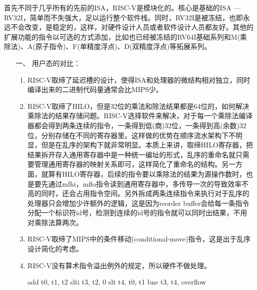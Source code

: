 首先不同于几乎所有的先前的ISA，RISC-V是模块化的。核心是基础的ISA --- RV32I，简单而不失强大，足以运行整个软件栈。同时，RV32I是被冻结，也即永远不会改变，是稳定的，这样，对硬件设计人员或者软件设计人员都友好。其他的扩展功能的指令以可选的方式添加，比如也已经被冻结的RV64I基础系列和M(乘除法)、A(原子指令)、F(单精度浮点)、D(双精度浮点)等拓展系列\citep{Patterson:2017:RRO:3202479}。
\begin{enumerate}%
	\item[一、] 用户态的对比：
	\begin{enumerate}[label=(\alph*)]
		\item RISC-V取缔了延迟槽的设计，使得ISA和处理器的微结构相对独立，同时编译出来的二进制代码量通常会比MIPS少。
		\item RISC-V取缔了HILO，但是32位的乘法和除法结果都是64位的，如何解决乘除法的结果存储问题。RISC-V选择软件来解决，对于每一个乘除法编译器都会得到两条连续的指令，一条得到低(商)32位，一条得到高(余数)32位，分别存储在不同的寄存器里。这样做的优势在顺序流水架构下不明显，但是在乱序的架构下就非常明显。本质上来讲，取缔HILO寄存器，把结果拆开存入通用寄存器中是一种统一编址的形式，乱序的重命名就只需要管理通用寄存器的映射关系即可，这样简化了重命名的结构。另一方面，就算有HILO寄存器，后续的指令要以乘除法的结果为源操作数时，也是要先通过mfhi，mflo指令读到通用寄存器中，多传导一次的导致效率不高的同时，还会占用指令空间。另外拆成两条连续指令来执行对于乱序的处理器只会增加少许额外的逻辑，这是因为reorder buffer会给每一条指令分配一个标识符id号，检测到连续的id号的指令就可以同时出结果，不用对乘除法算两次。
		\item RISC-V取缔了MIPS中的条件移动(conditional-move)指令，这是出于乱序设计简化的考虑。
		\item RISC-V没有算术指令溢出例外的规定，所以硬件不做处理。
		\begin{scala}
			add t0, t1, t2
			slti t3, t2, 0
			slt t4, t0, t1
			bne t3, t4, overflow
		\end{scala}
	

\end{enumerate}
\end{enumerate}
